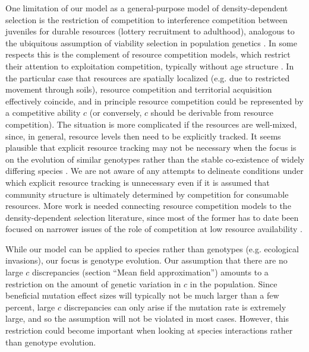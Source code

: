 \documentclass[11pt]{article}
\begin{document}
One limitation of our model as a general-purpose model of density-dependent selection is the restriction of competition to interference competition between juveniles for durable resources (lottery recruitment to adulthood), analogous to the ubiquitous assumption of viability selection in population genetics \citep[p. 45]{ewens_2004}. In some respects this is the complement of resource competition models, which restrict their attention to exploitation competition, typically without age structure \citep{tilman_1982}. In the particular case that resources are spatially localized (e.g. due to restricted movement through soils), resource competition and territorial acquisition effectively coincide, and in principle resource competition could be represented by a competitive ability $c$ (or conversely, $c$ should be derivable from resource competition). The situation is more complicated if the resources are well-mixed, since, in general, resource levels then need to be explicitly tracked. It seems plausible that explicit resource tracking may not be necessary when the focus is on the evolution of similar genotypes rather than the stable co-existence of widely differing species \citep{ram_2016}. We are not aware of any attempts to delineate conditions under which explicit resource tracking is unnecessary even if it is assumed that community structure is ultimately determined by competition for consumable resources. More work is needed connecting resource competition models to the density-dependent selection literature, since most of the former has to date been focused on narrower issues of the role of competition at low resource availability \citep{aerts_1999,davis_1998,tilman_2007}.  

While our model can be applied to species rather than genotypes (e.g. ecological invasions), our focus is genotype evolution. Our assumption that there are no large $c$ discrepancies (section ``Mean field approximation'') amounts to a restriction on the amount of genetic variation in $c$ in the population. Since beneficial mutation effect sizes will typically not be much larger than a few percent, large $c$ discrepancies can only arise if the mutation rate is extremely large, and so the assumption will not be violated in most cases. However, this restriction could become important when looking at species interactions rather than genotype evolution.

\end{document}

